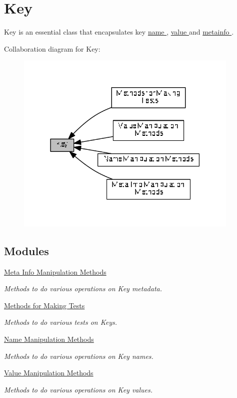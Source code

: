 \hypertarget{group__key}{}\section{Key}
\label{group__key}


Key is an essential class that encapsulates key \hyperlink{group__keyname}{name }, \hyperlink{group__keyvalue}{value } and \hyperlink{group__keymeta}{metainfo }.  


Collaboration diagram for Key\+:
\nopagebreak
\begin{figure}[H]
\begin{center}
\leavevmode
\includegraphics[width=303pt]{group__key}
\end{center}
\end{figure}
\subsection*{Modules}
\begin{DoxyCompactItemize}
\item 
\hyperlink{group__keymeta}{Meta Info Manipulation Methods}
\begin{DoxyCompactList}\small\item\em Methods to do various operations on Key metadata. \end{DoxyCompactList}\item 
\hyperlink{group__keytest}{Methods for Making Tests}
\begin{DoxyCompactList}\small\item\em Methods to do various tests on Keys. \end{DoxyCompactList}\item 
\hyperlink{group__keyname}{Name Manipulation Methods}
\begin{DoxyCompactList}\small\item\em Methods to do various operations on Key names. \end{DoxyCompactList}\item 
\hyperlink{group__keyvalue}{Value Manipulation Methods}
\begin{DoxyCompactList}\small\item\em Methods to do various operations on Key values. \end{DoxyCompactList}\end{DoxyCompactItemize}
